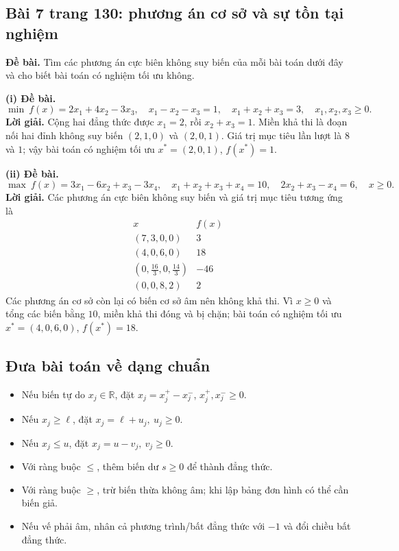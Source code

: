 \documentclass[11pt,a4paper]{article}
\newcommand{\R}{\mathbb{R}}
\begin{document}
\subsection{Bài 7 trang 130: phương án cơ sở và sự tồn tại nghiệm}
\textbf{Đề bài.} Tìm các phương án cực biên không suy biến của mỗi bài toán dưới đây và cho biết bài toán có nghiệm tối ưu không.

\begin{samepage}
\textbf{(i) Đề bài.}
\[
\min\ f(x)=2x_1+4x_2-3x_3,\quad
x_1-x_2-x_3=1,\quad x_1+x_2+x_3=3,\quad x_1,x_2,x_3\ge0.
\]
\textbf{Lời giải.} Cộng hai đẳng thức được \(x_1=2\), rồi \(x_2+x_3=1\). Miền khả thi là đoạn nối hai đỉnh không suy biến \((2,1,0)\) và \((2,0,1)\). Giá trị mục tiêu lần lượt là \(8\) và \(1\); vậy bài toán có nghiệm tối ưu \(x^*=(2,0,1)\), \(f(x^*)=1\).
\end{samepage}

\begin{samepage}
\textbf{(ii) Đề bài.}
\[
\max\ f(x)=3x_1-6x_2+x_3-3x_4,\quad
x_1+x_2+x_3+x_4=10,\quad 2x_2+x_3-x_4=6,\quad x\ge0.
\]
\textbf{Lời giải.} Các phương án cực biên không suy biến và giá trị mục tiêu tương ứng là
\[
\begin{array}{c|r}
x & f(x)\\ \hline
(7,3,0,0) & 3\\
(4,0,6,0) & 18\\
(0,\frac{16}{3},0,\frac{14}{3}) & -46\\
(0,0,8,2) & 2
\end{array}
\]
Các phương án cơ sở còn lại có biến cơ sở âm nên không khả thi. Vì \(x\ge0\) và tổng các biến bằng \(10\), miền khả thi đóng và bị chặn; bài toán có nghiệm tối ưu \(x^*=(4,0,6,0)\), \(f(x^*)=18\).
\end{samepage}

\subsection{Đưa bài toán về dạng chuẩn}
\begin{itemize}
\item Nếu biến tự do \(x_j\in\R\), đặt \(x_j=x_j^+-x_j^-\), \(x_j^+,x_j^-\ge0\).
\item Nếu \(x_j\ge \ell\), đặt \(x_j=\ell+u_j,\ u_j\ge0\).
\item Nếu \(x_j\le u\), đặt \(x_j=u-v_j,\ v_j\ge0\).
\item Với ràng buộc \(\le\), thêm biến dư \(s\ge0\) để thành đẳng thức.
\item Với ràng buộc \(\ge\), trừ biến thừa không âm; khi lập bảng đơn hình có thể cần biến giả.
\item Nếu vế phải âm, nhân cả phương trình/bất đẳng thức với \(-1\) và đổi chiều bất đẳng thức.
\end{itemize}
\end{document}

